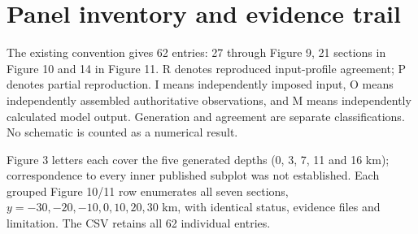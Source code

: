 \section{Panel inventory and evidence trail}

The existing convention gives 62 entries: 27 through Figure 9, 21 sections in Figure 10 and 14 in Figure 11. R denotes reproduced input-profile agreement; P denotes partial reproduction. I means independently imposed input, O means independently assembled authoritative observations, and M means independently calculated model output. Generation and agreement are separate classifications. No schematic is counted as a numerical result.

Figure 3 letters each cover the five generated depths (0, 3, 7, 11 and 16 km); correspondence to every inner published subplot was not established. Each grouped Figure 10/11 row enumerates all seven sections, $y=-30,-20,-10,0,10,20,30$ km, with identical status, evidence files and limitation. The CSV retains all 62 individual entries.

\small\setlength{\tabcolsep}{4pt}

